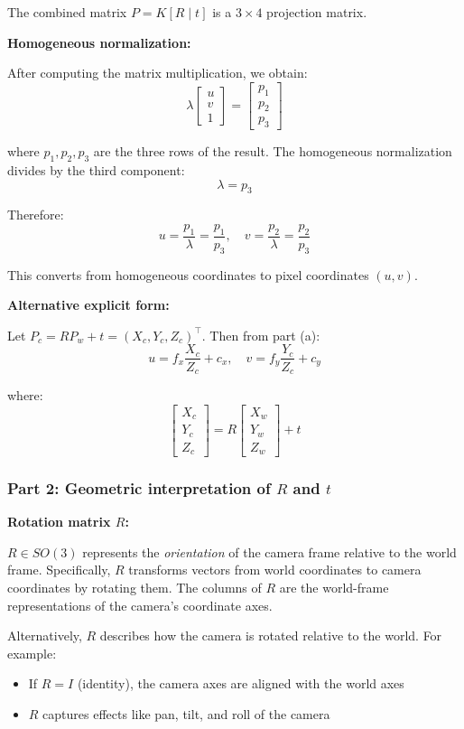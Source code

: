 \documentclass[11pt]{article}
\begin{document}
The combined matrix $P = K [R \mid t]$ is a $3 \times 4$ projection matrix.

\textbf{Homogeneous normalization:}

After computing the matrix multiplication, we obtain:
\[
\lambda \begin{bmatrix} u \\ v \\ 1 \end{bmatrix} = \begin{bmatrix} p_1 \\ p_2 \\ p_3 \end{bmatrix}
\]

where $p_1, p_2, p_3$ are the three rows of the result. The homogeneous normalization divides by the third component:
\[
\lambda = p_3
\]

Therefore:
\[
u = \frac{p_1}{\lambda} = \frac{p_1}{p_3}, \quad v = \frac{p_2}{\lambda} = \frac{p_2}{p_3}
\]

This converts from homogeneous coordinates to pixel coordinates $(u, v)$.

\textbf{Alternative explicit form:}

Let $P_c = R P_w + t = (X_c, Y_c, Z_c)^\top$. Then from part (a):
\[
u = f_x \frac{X_c}{Z_c} + c_x, \quad v = f_y \frac{Y_c}{Z_c} + c_y
\]

where:
\[
\begin{bmatrix} X_c \\ Y_c \\ Z_c \end{bmatrix} = R \begin{bmatrix} X_w \\ Y_w \\ Z_w \end{bmatrix} + t
\]

\subsubsection*{Part 2: Geometric interpretation of $R$ and $t$}

\textbf{Rotation matrix $R$:}

$R \in SO(3)$ represents the \textit{orientation} of the camera frame relative to the world frame. Specifically, $R$ transforms vectors from world coordinates to camera coordinates by rotating them. The columns of $R$ are the world-frame representations of the camera's coordinate axes.

Alternatively, $R$ describes how the camera is rotated relative to the world. For example:
\begin{itemize}
    \item If $R = I$ (identity), the camera axes are aligned with the world axes
    \item $R$ captures effects like pan, tilt, and roll of the camera
\end{itemize}
\end{document}
